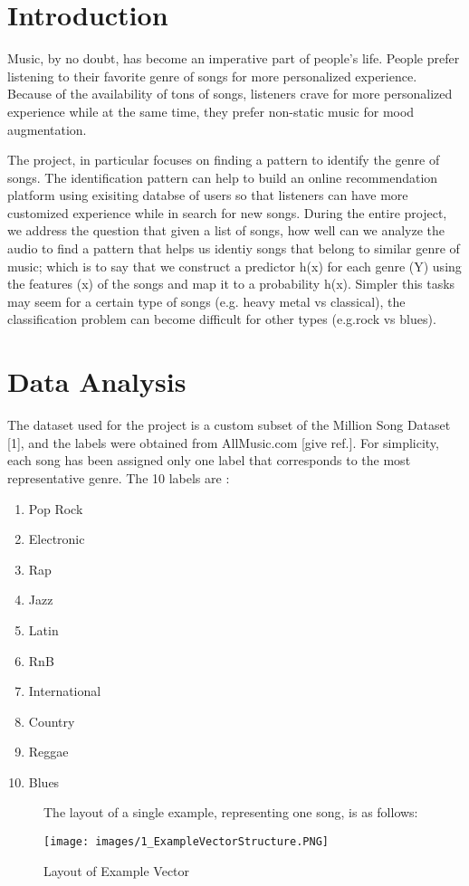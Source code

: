\documentclass[journal]{IEEEtran}
\begin{document}
\section{Introduction}
Music, by no doubt, has become an imperative part of people's life. People prefer listening to their favorite genre of songs for more personalized experience. Because of the availability of tons of songs, listeners crave for more personalized experience while at the same time, they prefer non-static music for mood augmentation. \par
The project, in particular focuses on finding a pattern to identify the genre of songs. The identification pattern can help to build an online recommendation platform using exisiting databse of users so that listeners can have more customized experience while in search for new songs. During the entire project, we address the question that given a list of songs, how well can we analyze the audio to find a pattern that helps us identiy songs that belong to similar genre of music; which is to say that we construct a predictor h(x) for each genre (Y) using the features (x) of the songs and map it to a probability h(x). Simpler this tasks may seem for a certain type of songs (e.g. heavy metal vs classical), the classification problem can become difficult for other types (e.g.rock vs blues).


\section{Data Analysis}
The dataset used for the project is a custom subset of the Million Song Dataset [1], and the labels were obtained from AllMusic.com [give ref.]. For simplicity, each song has been assigned only one label that corresponds to the most representative genre. The 10 labels are :
\begin{enumerate}
	\item Pop Rock
	\item Electronic
	\item Rap
	\item Jazz
	\item Latin
	\item RnB
	\item International
	\item Country
	\item Reggae
	\item Blues
\end{enumerate}
\begin{figure}[h!]
The layout of a single example, representing one song, is as follows: \par
\begin{center}
	\texttt{[image: images/1\_ExampleVectorStructure.PNG]}
	\caption{Layout of Example Vector}
	\label{fig: Fig.1}
\end{center}
\end{figure}
\end{document}
